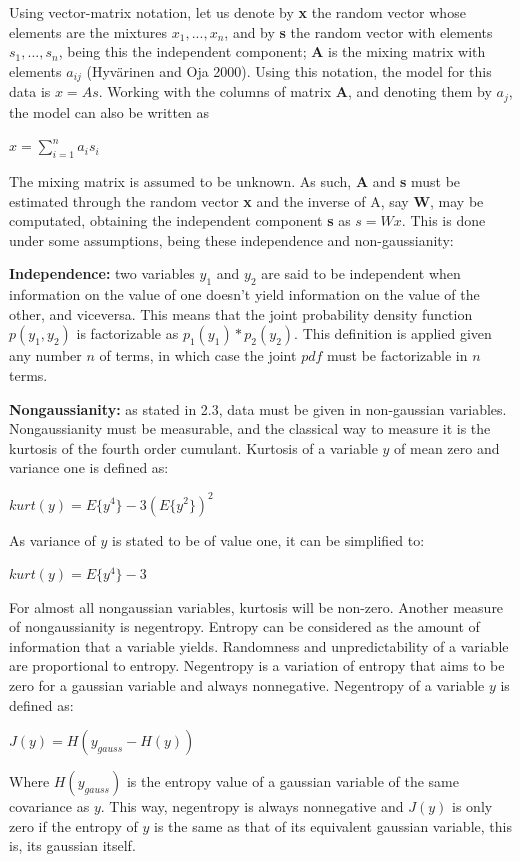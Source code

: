 \documentclass[]{article}
\begin{document}
Using vector-matrix notation, let us denote by \textbf{x} the random
vector whose elements are the mixtures \(x_1,...,x_n\), and by
\textbf{s} the random vector with elements \(s_1,...,s_n\), being this
the independent component; \textbf{A} is the mixing matrix with elements
\(a_{ij}\) (Hyv{ä}rinen and Oja 2000). Using this notation, the model
for this data is \(x = As\). Working with the columns of matrix
\textbf{A}, and denoting them by \(a_j\), the model can also be written
as

\(x = \sum_{i=1}^n a_is_i\)

The mixing matrix is assumed to be unknown. As such, \textbf{A} and
\textbf{s} must be estimated through the random vector \textbf{x} and
the inverse of A, say \textbf{W}, may be computated, obtaining the
independent component \textbf{s} as \(s = Wx\). This is done under some
assumptions, being these independence and non-gaussianity:

\textbf{Independence:} two variables \(y_1\) and \(y_2\) are said to be
independent when information on the value of one doesn't yield
information on the value of the other, and viceversa. This means that
the joint probability density function \(p(y_1,y_2)\) is factorizable as
\(p_1(y_1)*p_2(y_2)\). This definition is applied given any number \(n\)
of terms, in which case the joint \(pdf\) must be factorizable in \(n\)
terms.

\textbf{Nongaussianity:} as stated in 2.3, data must be given in
non-gaussian variables. Nongaussianity must be measurable, and the
classical way to measure it is the kurtosis of the fourth order
cumulant. Kurtosis of a variable \(y\) of mean zero and variance one is
defined as:

\(kurt(y) = E\{y^4\} - 3(E\{y^2\})^2\)

As variance of \(y\) is stated to be of value one, it can be simplified
to:

\(kurt(y) = E\{y^4\} - 3\)

For almost all nongaussian variables, kurtosis will be non-zero. Another
measure of nongaussianity is negentropy. Entropy can be considered as
the amount of information that a variable yields. Randomness and
unpredictability of a variable are proportional to entropy. Negentropy
is a variation of entropy that aims to be zero for a gaussian variable
and always nonnegative. Negentropy of a variable \(y\) is defined as:

\(J(y) = H(y_{gauss} - H(y))\)

Where \(H(y_{gauss})\) is the entropy value of a gaussian variable of
the same covariance as \(y\). This way, negentropy is always nonnegative
and \(J(y)\) is only zero if the entropy of \(y\) is the same as that of
its equivalent gaussian variable, this is, its gaussian itself.
\end{document}

